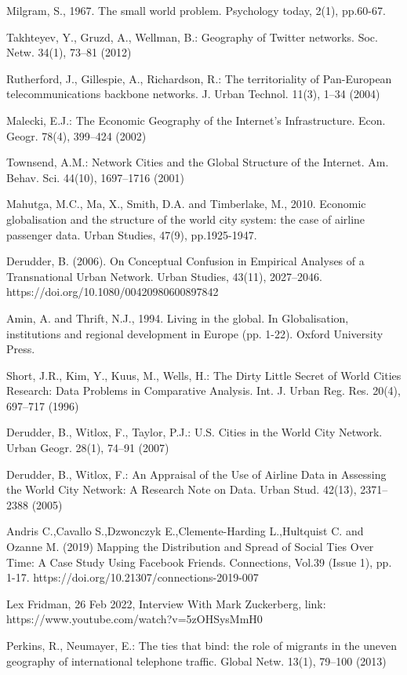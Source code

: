 \documentclass[12pt]{article}
\begin{document}
Milgram, S., 1967. The small world problem. Psychology today, 2(1), pp.60-67.

Takhteyev, Y., Gruzd, A., Wellman, B.: Geography of Twitter networks. Soc. Netw.
34(1), 73–81 (2012)

Rutherford, J., Gillespie, A., Richardson, R.: The territoriality of Pan-European
telecommunications backbone networks. J. Urban Technol. 11(3), 1–34 (2004)

Malecki, E.J.: The Economic Geography of the Internet’s Infrastructure. Econ.
Geogr. 78(4), 399–424 (2002)

Townsend, A.M.: Network Cities and the Global Structure of the Internet. Am.
Behav. Sci. 44(10), 1697–1716 (2001)

Mahutga, M.C., Ma, X., Smith, D.A. and Timberlake, M., 2010. Economic globalisation and the structure of the world city system: the case of airline passenger data. Urban Studies, 47(9), pp.1925-1947.

Derudder, B. (2006). On Conceptual Confusion in Empirical Analyses of a Transnational Urban Network. Urban Studies, 43(11), 2027–2046. https://doi.org/10.1080/00420980600897842

Amin, A. and Thrift, N.J., 1994. Living in the global. In Globalisation, institutions and regional development in Europe (pp. 1-22). Oxford University Press.

Short, J.R., Kim, Y., Kuus, M., Wells, H.: The Dirty Little Secret of World Cities
Research: Data Problems in Comparative Analysis. Int. J. Urban Reg. Res. 20(4),
697–717 (1996)

Derudder, B., Witlox, F., Taylor, P.J.: U.S. Cities in the World City Network.
Urban Geogr. 28(1), 74–91 (2007)

Derudder, B., Witlox, F.: An Appraisal of the Use of Airline Data in Assessing the
World City Network: A Research Note on Data. Urban Stud. 42(13), 2371–2388
(2005)

Andris C.,Cavallo S.,Dzwonczyk E.,Clemente-Harding L.,Hultquist C. and Ozanne M. (2019) Mapping the Distribution and Spread of Social Ties Over Time: A Case Study Using Facebook Friends. Connections, Vol.39 (Issue 1), pp. 1-17. https://doi.org/10.21307/connections-2019-007

Lex Fridman, 26 Feb 2022, Interview With Mark Zuckerberg, link: https://www.youtube.com/watch?v=5zOHSysMmH0

Perkins, R., Neumayer, E.: The ties that bind: the role of migrants in the uneven
geography of international telephone traffic. Global Netw. 13(1), 79–100 (2013)
\end{document}
